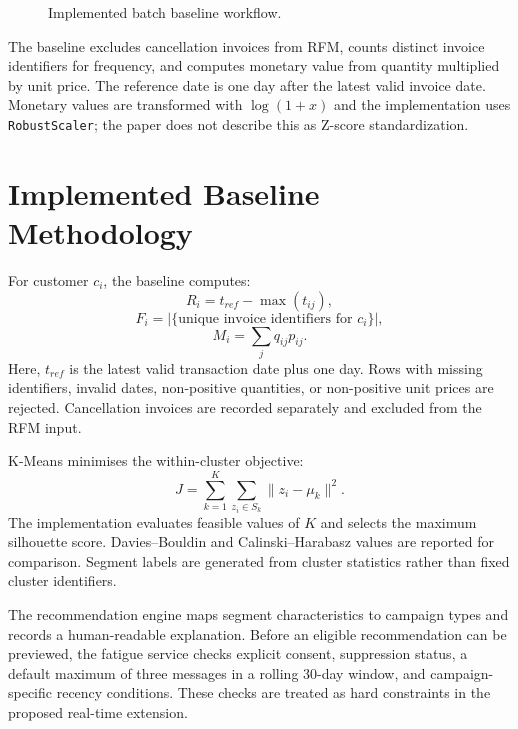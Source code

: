 \documentclass[conference]{IEEEtran}
\begin{document}
\begin{figure}[!t]
\centering
{}
\caption{Implemented batch baseline workflow.}
\label{fig:baseline}
\end{figure}

The baseline excludes cancellation invoices from RFM, counts distinct invoice identifiers for frequency, and computes monetary value from quantity multiplied by unit price. The reference date is one day after the latest valid invoice date. Monetary values are transformed with $\log(1+x)$ and the implementation uses \texttt{RobustScaler}; the paper does not describe this as Z-score standardization.

\section{Implemented Baseline Methodology}
For customer $c_i$, the baseline computes:
\begin{equation}
R_i = t_{ref} - \max(t_{ij}),
\end{equation}
\begin{equation}
F_i = |\{\text{unique invoice identifiers for } c_i\}|,
\end{equation}
\begin{equation}
M_i = \sum_j q_{ij}p_{ij}.
\end{equation}
Here, $t_{ref}$ is the latest valid transaction date plus one day. Rows with missing identifiers, invalid dates, non-positive quantities, or non-positive unit prices are rejected. Cancellation invoices are recorded separately and excluded from the RFM input.

K-Means minimises the within-cluster objective:
\begin{equation}
J = \sum_{k=1}^{K}\sum_{z_i\in S_k}\lVert z_i-\mu_k\rVert^2.
\end{equation}
The implementation evaluates feasible values of $K$ and selects the maximum silhouette score. Davies--Bouldin and Calinski--Harabasz values are reported for comparison. Segment labels are generated from cluster statistics rather than fixed cluster identifiers.

The recommendation engine maps segment characteristics to campaign types and records a human-readable explanation. Before an eligible recommendation can be previewed, the fatigue service checks explicit consent, suppression status, a default maximum of three messages in a rolling 30-day window, and campaign-specific recency conditions. These checks are treated as hard constraints in the proposed real-time extension.
\end{document}
